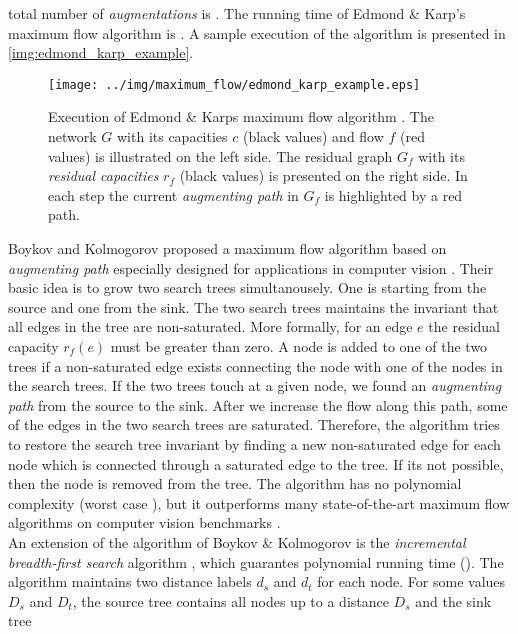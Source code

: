 total number of \emph{augmentations} is . The running time of Edmond \& Karp's
maximum flow algorithm is . A sample execution of the algorithm
is presented in \autoref{img:edmond_karp_example}. \\
\begin{figure}
\centering
\texttt{[image: ../img/maximum\_flow/edmond\_karp\_example.eps]}
\caption{Execution of Edmond \& Karps maximum flow algorithm \cite{edmonds1972theoretical}.
         The network $G$ with its capacities $c$ (black values) and flow $f$ (red values) is illustrated
         on the left side. The residual graph $G_f$ with its \emph{residual capacities} $r_f$ (black values)
         is presented on the right side. In each step the current \emph{augmenting path} in $G_f$ is highlighted
         by a red path. }
\label{img:edmond_karp_example}
\end{figure}
Boykov and Kolmogorov proposed a maximum flow algorithm based on \emph{augmenting path} especially
designed for applications in computer vision \cite{boykov2004experimental}. Their basic idea is to 
grow two search trees simultanousely. One is starting from the source and one from the sink.
The two search trees maintains the invariant that all edges in the tree are non-saturated. More formally,
for an edge $e$ the residual capacity $r_f(e)$ must be greater than zero.
A node is added to one of the two trees if a non-saturated edge exists connecting
the node with one of the nodes in the search trees. If the two trees touch at a given node, we found
an \emph{augmenting path} from the source to the sink. After we increase the flow along this
path, some of the edges in the two search trees are saturated. Therefore, the algorithm
tries to restore the search tree invariant by finding a new non-saturated edge for each node which
is connected through a saturated edge to the tree. If its not possible, then the node is removed
from the tree. The algorithm has no polynomial complexity (worst case ), but it
outperforms many state-of-the-art maximum flow algorithms on computer vision benchmarks \cite{boykov2004experimental}.\\
An extension of the algorithm of Boykov \& Kolmogorov is the \emph{incremental breadth-first search}
algorithm \cite{goldberg2011maximum}, which guarantes polynomial running time ().
The algorithm maintains two distance labels $d_s$ and $d_t$ for each node. For some values 
$D_s$ and $D_t$, the source tree contains all nodes up to a distance $D_s$ and the sink tree

